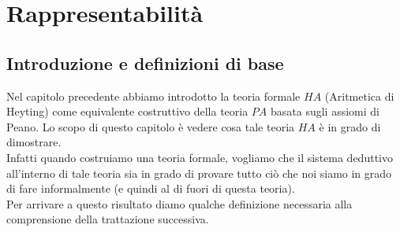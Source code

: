 \chapter{Rappresentabilità}


\section{Introduzione e definizioni di base}

Nel capitolo precedente abbiamo introdotto la teoria formale $HA$ (Aritmetica di Heyting) come equivalente costruttivo della teoria $PA$ basata sugli assiomi di Peano. Lo scopo di questo capitolo \`e vedere cosa tale teoria $HA$ \`e in grado di dimostrare.\\
Infatti quando costruiamo una teoria formale, vogliamo che il sistema deduttivo all'interno di tale teoria sia in grado di provare tutto ci\`o che noi siamo in grado di fare informalmente (e quindi al di fuori di questa teoria).\\
Per arrivare a questo risultato diamo qualche definizione necessaria alla comprensione della trattazione successiva.\\

